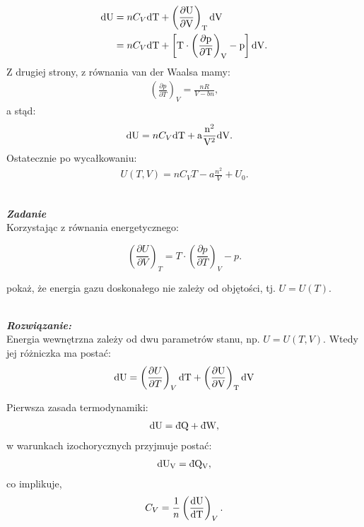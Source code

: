 \documentclass[11pt,a4paper]{article}
\newcounter{zadanie}\newcommand{\zadanie}[1][]{\addtocounter{zadanie}{1} ~\\  {\bf \emph{Zadanie \arabic{zadanie} #1 }} \\}
\newcounter{wskazowka}\newcommand{\wskazowka}[1][]{\addtocounter{wskazowka}{1} ~\\  {\bf \emph{Wskazówka \arabic{wskazowka} #1 }} \\}
\newcounter{rozwiazanie}\newcommand{\rozwiazanie}[1][]{\addtocounter{rozwiazanie}{1} ~\\  {\bf \emph{Rozwiązanie: }} \\}
\newcommand{\dbar}{{\mkern3mu\mathchar'26\mkern-12mu d}}
\begin{document}
\begin{align}
  \rm{d} U &= n C_V \rm{d}T + \left(\frac{\partial U}{\partial V} \right)_T \rm{d}V \\
 &= n C_V \rm{d}T + \left[    T \cdot \left(\frac{\partial p}{\partial T}\right)_V - p\right] \rm{d}V.
\end{align}
 Z drugiej strony, z równania van der Waalsa mamy:
 \begin{align}
 \left( \frac{\partial p}{\partial T} \right)_V = \frac{nR}{V - bn},
 \end{align}
 a stąd: 
 \begin{align}
  \rm{d} U &=  n C_V \rm{d} T + a \frac{n^2}{V^2} \rm{d}V.
 \end{align}
 Ostatecznie po wycałkowaniu:
 \begin{align}
 U(T, V) = n C_V T - a \frac{n^2}{V}  + U_0.
 \end{align}


\newpage
 
\zadanie
Korzystając z równania energetycznego:

\[ \left(\frac{\partial U}{\partial V}\right)_T = 
T \cdot \left(\frac{\partial p}{\partial T}\right)_V - p.\]

pokaż, że energia gazu doskonałego nie zależy od objętości, tj. $U=U(T)$.

\vspace{5mm}
\rozwiazanie

Energia wewnętrzna zależy od dwu parametrów stanu, np. $U = U(T, V)$. Wtedy jej różniczka ma postać:
\begin{align}
  \rm{d} U &= \left(\frac{\partial U}{\partial T} \right)_V \rm{d}T  + \left(\frac{\partial U}{\partial V} \right)_T \rm{d}V \\
\end{align}

Pierwsza zasada termodynamiki:
\begin{align}
\rm{d}U = \rm{\dbar}Q + \rm{\dbar}W,
\end{align}
w warunkach izochorycznych przyjmuje postać:
\begin{align}
\rm{d}U_V = \rm{\dbar}Q _V, 
\end{align}
co implikuje,
\begin{align}
C_V = \frac{1}{n}\left( \frac{\rm{d}U}{\rm{d}T}\right)_V.
\end{align}
\end{document}
